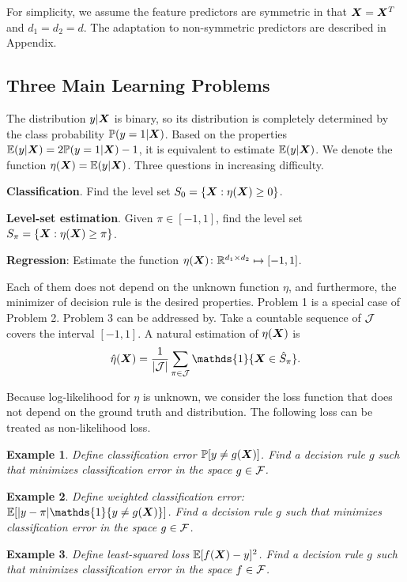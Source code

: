 \documentclass[12pt]{article}
\newtheorem{example}{Example}
\begin{document}
For simplicity, we assume the feature predictors are symmetric in that $\bm X=\bm X^T$ and $d_1=d_2=d$. The adaptation to non-symmetric predictors are described in Appendix. 


\subsection{Three Main Learning Problems}
The distribution $y|\bm X$ is binary, so its distribution is completely determined by the class probability $\mathbb{P}(y=1|\bm X)$. Based on the properties $\mathbb{E}(y|\bm X) = 2\mathbb{P}(y=1|\bm X)-1$, it is equivalent to estimate $\mathbb{E}(y|\bm X)$. We denote the function $\eta(\bm X)=\mathbb{E}(y|\bm X)$. Three questions in increasing difficulty.

{\bf Classification}. Find the level set $S_{0}=\{\bm X: \eta(\bm X) \geq 0\}$. 

{\bf Level-set estimation}. Given $\pi\in[-1,1]$, find the level set $S_{\pi}=\{\bm X: \eta(\bm X)\geq \pi\}$.

{\bf Regression}: Estimate the function $\eta(\bm X)\colon \mathbb{R}^{d_1\times d_2} \mapsto [-1,1]$. 

Each of them does not depend on the unknown function $\eta$, and furthermore, the minimizer of decision rule is the desired properties. Problem 1 is a special case of Problem 2. Problem 3 can be addressed by. Take a countable sequence of $\mathcal{J}$ covers the interval $[-1,1]$. A natural estimation of $\eta(\bm X)$ is
\[
\hat \eta(\mX)={1\over |\tJ|}\sum_{\pi \in \tJ}\mathds{1}\{\mX\in \hat S_\pi\}.
\]


Because log-likelihood for $\eta $ is unknown, we consider the loss function that does not depend on the ground truth and distribution. The following loss can be treated as non-likelihood loss. 

\begin{example}
Define classification error $\mathbb{P}[y \neq g(\bm X)]$. Find a decision rule $g$ such that minimizes classification error in the space $g\in\mathcal{F}$. 
\end{example}

\begin{example} Define weighted classification error: $\mathbb{E}[|y - \pi| \mathds{1}\{y\neq g(\mX)\}]$. Find a decision rule $g$ such that minimizes classification error in the space $g\in\mathcal{F}$. 

\end{example}

\begin{example}
Define least-squared loss $\mathbb{E}[f(\bm X)-y]^2$. Find a decision rule $g$ such that minimizes classification error in the space $f \in\mathcal{F}$.
\end{example}
\end{document}
